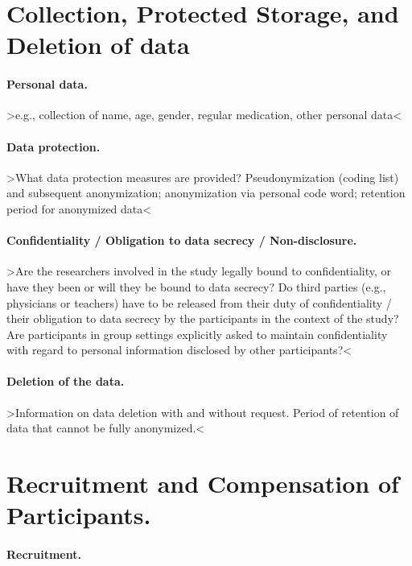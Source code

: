 \documentclass[11pt,twoside,a4paper]{article}
\begin{document}
\section{Collection, Protected Storage, and Deletion of data}

\paragraph{Personal data.}

>e.g., collection of name, age, gender, regular medication, other personal data<


\paragraph{Data protection.}

>What data protection measures are provided? Pseudonymization (coding list) and subsequent anonymization; anonymization via personal code word; retention period for anonymized data<


\paragraph{Confidentiality / Obligation to data secrecy / Non-disclosure.}

>Are the researchers involved in the study legally bound to confidentiality, or have they been or will they be bound to data secrecy?
Do third parties (e.g., physicians or teachers) have to be released from their duty of confidentiality / their obligation to data secrecy by the participants in the context of the study?
Are participants in group settings explicitly asked to maintain confidentiality with regard to personal information disclosed by other participants?<

\paragraph{Deletion of the data.} 

>Information on data deletion with and without request. Period of retention of data that cannot be fully anonymized.<

\section{Recruitment and Compensation of Participants.}

\paragraph{Recruitment.}
\end{document}

